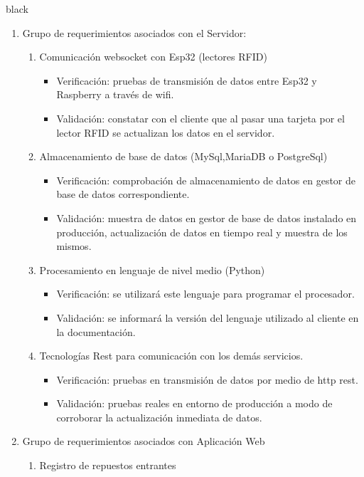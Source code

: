 \documentclass[11pt]{charter}
\begin{document}
\begin{consigna}{black}

\begin{enumerate}
\item Grupo de requerimientos asociados con el Servidor:
	\begin{enumerate}
	\item Comunicación websocket con Esp32 (lectores RFID)
	\begin{itemize}
	\item Verificación: pruebas de transmisión de datos entre Esp32 y Raspberry a través de wifi.  
	\item Validación: constatar con el cliente que al pasar una tarjeta por el lector RFID se actualizan los datos en el servidor.  
	\end{itemize}
	\item Almacenamiento de base de datos (MySql,MariaDB o PostgreSql)
	\begin{itemize}
	\item Verificación: comprobación de almacenamiento de datos en gestor de base de datos correspondiente.
	\item Validación: muestra de datos en gestor de base de datos instalado en producción, actualización de datos en tiempo real y muestra de los mismos.  
	\end{itemize}
	\item Procesamiento en lenguaje de nivel medio (Python)
	\begin{itemize}
	\item Verificación: se utilizará este lenguaje para programar el procesador. 
	\item Validación: se informará la versión del lenguaje utilizado al cliente en la documentación.  
	\end{itemize}
	\item Tecnologías Rest para comunicación con los demás servicios.
	\begin{itemize}
	\item Verificación: pruebas en transmisión de datos por medio de http rest. 
	\item Validación: pruebas reales en entorno de producción a modo de corroborar la actualización inmediata de datos.  
	\end{itemize}
	\end{enumerate}
\item Grupo de requerimientos asociados con Aplicación Web
	\begin{enumerate}
	\item Registro de repuestos entrantes

\end{enumerate}
\end{enumerate}
\end{consigna}
\end{document}
